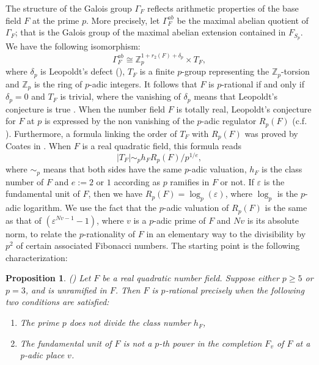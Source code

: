 \documentclass[12pt,reqno]{amsart}
\newtheorem{prop}{Proposition}
\newcommand{\Z}{\mathbb{Z}}
\begin{document}

The structure of the Galois group $\Gamma_F$ reflects arithmetic properties of the base field $F$ at the prime $p$.
More precisely, let $\Gamma_{F}^{ab}$ be the maximal abelian quotient of $\Gamma_F$; that is the Galois group of the maximal
abelian extension contained in $F_{S_p}$. We have the following isomorphism: $$\Gamma_{F}^{ab}\cong\mathbb{Z}_{p}^{1+r_2(F)+\delta_p}\times T_F,$$
where $\delta_p$ is Leopoldt's defect (\cite[Corollary 10.3.7]{NSW}), $T_F$ is a finite $p$-group representing the $\mathbb{Z}_p$-torsion and ${\Z_p}$ is the ring of $p$-adic integers.
It follows that $F$ is $p$-rational
if and only if $\delta_p=0$ and $T_F$ is trivial, where the vanishing of $\delta_p$ means that Leopoldt's conjecture is true \cite[Section 10.3]{NSW}.
When the number field $F$ is totally real, Leopoldt's conjecture for $F$ at $p$ is expressed by the non vanishing
of the $p$-adic regulator $R_p(F)$ (c.f. \cite[10.3.4 and 10.3.5]{NSW}). Furthermore,
a formula linking the order of $T_F$ with $R_p(F)$ was
proved by Coates in \cite[Lemma 8]{Co}. When $F$ is a real quadratic field, this formula reads
$$|T_F|\sim_p h_F R_p(F)/p^{1/e},$$
where $\sim_p$ means that both sides have the same $p$-adic valuation, $h_F$ is the class number of $F$ and $e := 2$ or $1$ according as $p$ ramifies in $F$ or not.
If $\varepsilon$ is the fundamental unit of $F$, then we have
$R_p(F)=\log_p(\varepsilon)$, where $\log_p$ is the $p$-adic logarithm. We use the fact that the $p$-adic valuation of $R_p(F)$ is the same as that of $(\varepsilon^{Nv-1}- 1)$, where $v$ is a $p$-adic prime of $F$ and $Nv$ is its absolute norm, to relate the $p$-rationality of $F$ in an elementary way to the divisibility by $p^2$ of certain associated Fibonacci numbers. The starting point is the following characterization:



\begin{prop}(\cite[Proposition 4.1]{Greenberg})
	Let $F$ be a real quadratic number field. Suppose either $p\geq 5$ or $p =3$, and is unramified in
	$F$. Then $F$ is $p$-rational precisely when the following two conditions are satisfied:
	\begin{enumerate}
		\item[(i)] The prime $p$ does not divide the class number $h_F$,
		\item[(ii)] The fundamental unit of $F$ is not a $p$-th power in the completion $F_v$ of $F$ at a p-adic place $v$.
	\end{enumerate}
\end{prop}
\end{document}
